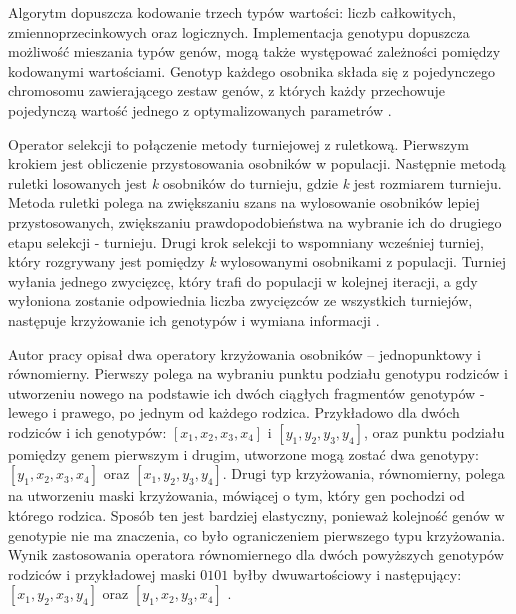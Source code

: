 \par
Algorytm dopuszcza kodowanie trzech typów wartości: liczb całkowitych, zmiennoprzecinkowych oraz logicznych.
Implementacja genotypu dopuszcza możliwość mieszania typów genów, mogą także występować zależności pomiędzy kodowanymi wartościami.
Genotyp każdego osobnika składa się z pojedynczego chromosomu zawierającego zestaw genów, z których każdy przechowuje pojedynczą wartość jednego z optymalizowanych parametrów \cite[str. 30]{klyk}.

\par
Operator selekcji to połączenie metody turniejowej z ruletkową.
Pierwszym krokiem jest obliczenie przystosowania osobników w populacji.
Następnie metodą ruletki losowanych jest \emph{k} osobników do turnieju, gdzie \emph{k} jest rozmiarem turnieju.
Metoda ruletki polega na zwiększaniu szans na wylosowanie osobników lepiej przystosowanych, zwiększaniu prawdopodobieństwa na wybranie ich do drugiego etapu selekcji - turnieju.
Drugi krok selekcji to wspomniany wcześniej turniej, który rozgrywany jest pomiędzy \emph{k} wylosowanymi osobnikami z populacji.
Turniej wyłania jednego zwycięzcę, który trafi do populacji w kolejnej iteracji, a gdy wyłoniona zostanie odpowiednia liczba zwycięzców ze wszystkich turniejów, następuje krzyżowanie ich genotypów i wymiana informacji \cite[str. 29]{klyk}.

\par
Autor pracy \cite{klyk} opisał dwa operatory krzyżowania osobników -- jednopunktowy i równomierny.
Pierwszy polega na wybraniu punktu podziału genotypu rodziców i utworzeniu nowego na podstawie ich dwóch ciągłych fragmentów genotypów - lewego i prawego, po jednym od każdego rodzica.
Przykładowo dla dwóch rodziców i ich genotypów: \( [x_{1}, x_{2}, x_{3}, x_{4}] \) i \( [y_{1}, y_{2}, y_{3}, y_{4}] \), oraz punktu podziału pomiędzy genem pierwszym i drugim, utworzone mogą zostać dwa genotypy:  \( [y_{1}, x_{2}, x_{3}, x_{4}] \) oraz \( [x_{1}, y_{2}, y_{3}, y_{4}] \).
Drugi typ krzyżowania, równomierny, polega na utworzeniu maski krzyżowania, mówiącej o tym, który gen pochodzi od którego rodzica.
Sposób ten jest bardziej elastyczny, ponieważ kolejność genów w genotypie nie ma znaczenia, co było ograniczeniem pierwszego typu krzyżowania.
Wynik zastosowania operatora równomiernego dla dwóch powyższych genotypów rodziców i przykładowej maski \( 0101 \) byłby dwuwartościowy i następujący: \( [x_{1}, y_{2}, x_{3}, y_{4}] \) oraz \( [y_{1}, x_{2}, y_{3}, x_{4}] \) \cite[str. 32]{klyk}.

